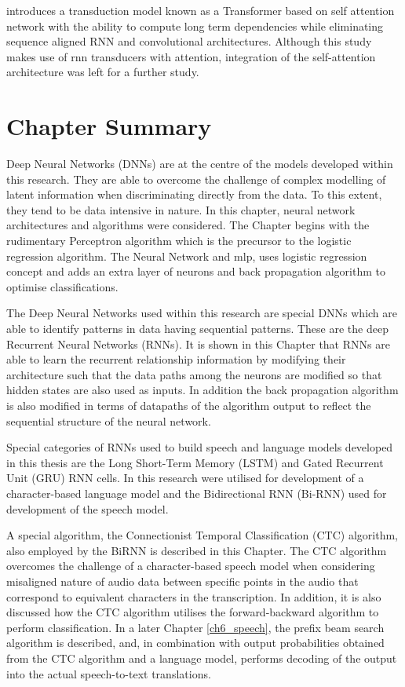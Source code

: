 \cite{vaswani2017attention} introduces a transduction model known as a Transformer based on self attention network with the ability to compute long term dependencies while eliminating sequence aligned RNN and convolutional architectures.  Although this study makes use of \acrshort{rnn} transducers with attention, integration of the self-attention architecture was left for a further study.
\stopblue

\section{Chapter Summary}
Deep Neural Networks (DNNs) are at the centre of the models developed within this research.  They are able to overcome the challenge of complex modelling of latent information when discriminating directly from the data.  To this extent, they tend to be data intensive in nature.  In this chapter, neural network architectures and algorithms were considered.  The Chapter begins with the rudimentary Perceptron algorithm which is the precursor to the logistic regression algorithm.  The Neural Network and \acrfull{mlp}, uses logistic regression concept and adds an extra layer of neurons and back propagation algorithm to optimise classifications.  

The Deep Neural Networks used within this research are special DNNs which are able to identify patterns in data having sequential patterns.  These are the deep Recurrent Neural Networks (RNNs).  It is shown in this Chapter that RNNs are able to learn the recurrent relationship information by modifying their architecture such that the data paths among the neurons are modified so that hidden states are also used as inputs.  In addition the back propagation algorithm is also modified in terms of datapaths of the algorithm output to reflect the sequential structure of the neural network.

Special categories of RNNs used to build speech and language models developed in this thesis are the Long Short-Term Memory (LSTM) and Gated Recurrent Unit (GRU) RNN cells.  In this research were utilised for development of a character-based language model and the Bidirectional RNN (Bi-RNN) used for development of the speech model.  

A special algorithm, the Connectionist Temporal Classification (CTC) algorithm, also employed by the BiRNN is described in this Chapter.  The CTC algorithm overcomes the challenge of a character-based speech model when considering misaligned nature of audio data between specific points in the audio that correspond to equivalent characters in the transcription.   In addition, it is also discussed how the CTC algorithm utilises the forward-backward algorithm to perform classification.  In a later Chapter \ref{ch6_speech}, the prefix beam search algorithm is described, and, in combination with output probabilities obtained from the CTC algorithm and a language model, performs decoding of the output into the actual speech-to-text translations.
